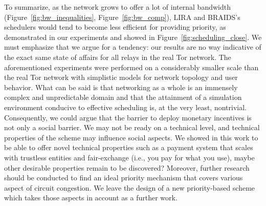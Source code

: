  
To summarize, as the network grows to offer a lot of internal bandwidth
(Figure~\ref{fig:bw_inequalities}, Figure~\ref{fig:bw_comp}), LIRA and BRAIDS's
schedulers would tend to become less efficient for providing priority, as
demonstrated in our experiments and showed in Figure~\ref{fig:scheduling_close}.
We must emphasize that we argue for a tendency: our results are no way
indicative of the exact same state of affairs for all relays in the real Tor
network. The aforementioned experiments were performed on a considerably smaller
scale than the real Tor network with simplistic models for network topology and
user behavior. What can be said is that networking as a whole is an immensely
complex and unpredictable domain and that the attainment of a simulation
environment conducive to effective scheduling is, at the very least, nontrivial.
Consequently, we could argue that the barrier to deploy monetary incentives is
not only a social barrier. We may not be ready on a technical level, and
technical properties of the scheme may influence social aspects. We showed in
this work to be able to offer novel technical properties such as a payment
system that scales with trustless entities and fair-exchange (i.e., you pay for
what you use), maybe other desirable properties remain to be discovered?
Moreover, further research should be conducted to find an ideal priority
mechanism that covers various aspect of circuit congestion. We leave the design
of a new priority-based scheme which takes those aspects in account as a further
work.

